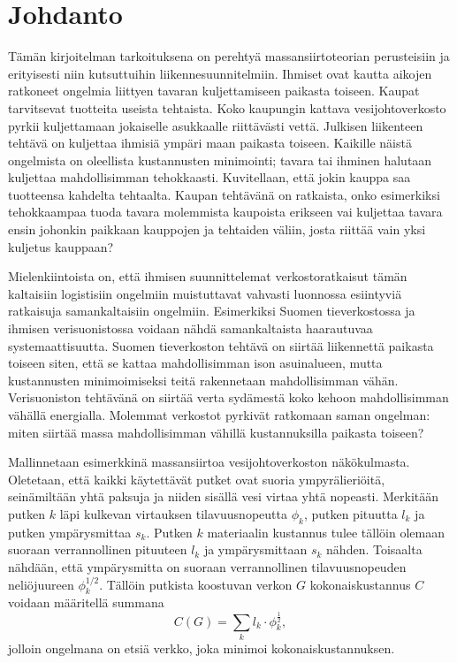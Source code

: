 \documentclass[12pt,oneside,a4paper]{amsbook} %
\begin{document}
\pagebreak

\chapter{Johdanto}
%
Tämän kirjoitelman tarkoituksena on perehtyä massansiirtoteorian perusteisiin ja erityisesti niin kutsuttuihin liikennesuunnitelmiin.
Ihmiset ovat kautta aikojen ratkoneet ongelmia liittyen tavaran kuljettamiseen paikasta toiseen. Kaupat tarvitsevat tuotteita useista tehtaista. Koko kaupungin kattava vesijohtoverkosto pyrkii kuljettamaan jokaiselle asukkaalle riittävästi vettä. Julkisen liikenteen tehtävä on kuljettaa ihmisiä ympäri maan paikasta toiseen. Kaikille näistä ongelmista on oleellista kustannusten minimointi; tavara tai ihminen halutaan kuljettaa mahdollisimman tehokkaasti. 
Kuvitellaan, että jokin kauppa saa tuotteensa kahdelta tehtaalta. Kaupan tehtävänä on ratkaista, onko esimerkiksi tehokkaampaa tuoda tavara molemmista kaupoista erikseen vai kuljettaa tavara ensin johonkin paikkaan kauppojen ja tehtaiden väliin, josta riittää vain yksi kuljetus kauppaan?

Mielenkiintoista on, että ihmisen suunnittelemat verkostoratkaisut tämän kaltaisiin logistisiin ongelmiin muistuttavat vahvasti luonnossa esiintyviä ratkaisuja samankaltaisiin ongelmiin. Esimerkiksi Suomen tieverkostossa ja ihmisen verisuonistossa voidaan nähdä samankaltaista haarautuvaa systemaattisuutta. Suomen tieverkoston tehtävä on siirtää liikennettä paikasta toiseen siten, että se kattaa mahdollisimman ison asuinalueen, mutta kustannusten minimoimiseksi teitä rakennetaan mahdollisimman vähän. Verisuoniston tehtävänä on siirtää verta sydämestä koko kehoon mahdollisimman vähällä energialla. Molemmat verkostot pyrkivät ratkomaan saman ongelman: miten siirtää massa mahdollisimman vähillä kustannuksilla paikasta toiseen? 

Mallinnetaan esimerkkinä massansiirtoa vesijohtoverkoston näkökulmasta. Oletetaan, että kaikki käytettävät putket ovat suoria ympyrälieriöitä, seinämiltään yhtä paksuja ja niiden sisällä vesi virtaa yhtä nopeasti. Merkitään putken $k$ läpi kulkevan virtauksen tilavuusnopeutta $\phi_k$, putken pituutta $l_k$ ja putken ympärysmittaa $s_k$. Putken $k$ materiaalin kustannus tulee tällöin olemaan suoraan verrannollinen pituuteen $l_k$ ja ympärysmittaan $s_k$ nähden. Toisaalta nähdään, että ympärysmitta on suoraan verrannollinen tilavuusnopeuden neliöjuureen $\phi_k^{1/2}$. Tällöin putkista koostuvan verkon $G$ kokonaiskustannus $C$ voidaan määritellä summana
    $$C(G) = \sum_k l_k \cdot \phi_k^\frac{1}{2},$$
jolloin ongelmana on etsiä verkko, joka minimoi kokonaiskustannuksen.
\end{document}
